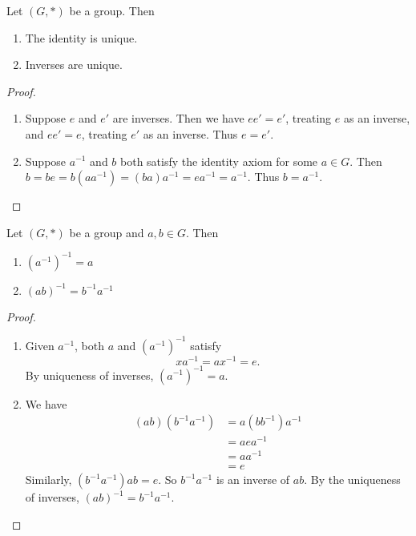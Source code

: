 \documentclass[a4paper]{article}
\begin{document}
  \begin{prop}
    Let $(G, *)$ be a group. Then
    \begin{enumerate}
      \item The identity is unique.
      \item Inverses are unique.
    \end{enumerate}
  \end{prop}
  \begin{proof}\leavevmode
    \begin{enumerate}[label=(\roman{*})]
      \item Suppose $e$ and $e'$ are inverses. Then we have $ee' = e'$, treating $e$ as an inverse, and $ee' = e$, treating $e'$ as an inverse. Thus $e = e'$.
      \item Suppose $a^{-1}$ and $b$ both satisfy the identity axiom for some $a\in G$. Then $b = be = b(aa^{-1}) = (ba)a^{-1} = ea^{-1} = a^{-1}$. Thus $b = a^{-1}$.
    \end{enumerate}
  \end{proof}
  \begin{prop}
    Let $(G, *)$ be a group and $a, b\in G$. Then
    \begin{enumerate}
      \item $(a^{-1})^{-1} = a$
      \item $(ab)^{-1} = b^{-1}a^{-1}$
    \end{enumerate}
  \end{prop}
  \begin{proof}\leavevmode
    \begin{enumerate}
      \item Given $a^{-1}$, both $a$ and  $(a^{-1})^{-1}$ satisfy
        \[
          xa^{-1} = ax^{-1} = e.
        \]
        By uniqueness of inverses, $(a^{-1})^{-1} = a$.
      \item We have
        \begin{align*}
          (ab)(b^{-1}a^{-1}) &= a(bb^{-1})a^{-1} \\
          &= aea^{-1}\\
          &= aa^{-1}\\
          &= e
        \end{align*}
        Similarly, $(b^{-1}a^{-1})ab = e$. So $b^{-1}a^{-1}$ is an inverse of $ab$. By the uniqueness of inverses, $(ab)^{-1} = b^{-1}a^{-1}$.
    \end{enumerate}
  \end{proof}
\end{document}
